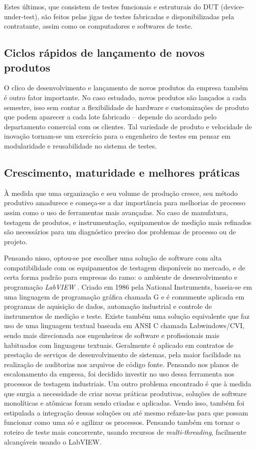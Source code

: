         Estes últimos, que consistem de testes funcionais e estruturais do DUT (device-under-test), são feitos pelas jigas de testes fabricadas e disponibilizadas pela contratante, assim como os computadores e softwares de teste.
    \subsection{Ciclos rápidos de lançamento de novos produtos}
         O clico de desenvolvimento e lançamento de novos produtos da empresa também é outro fator importante. No caso estudado, novos produtos são lançados a cada semestre, isso sem contar a flexibilidade de hardware e customizações de produto que podem aparecer a cada lote fabricado -- depende do acordado pelo departamento comercial com os clientes. Tal variedade de produto e velocidade de inovação tornam-se um exercício para o engenheiro de testes em pensar em modularidade e reusabilidade no sistema de testes.
    \subsection{Crescimento, maturidade e melhores práticas}
    
        À medida que uma organização e seu volume de produção cresce, seu método produtivo amadurece e começa-se a dar importância para melhorias de processo assim como o uso de ferramentas mais avançadas. No caso de manufatura, testagem de produtos, e instrumentação, equipamentos de medição mais refinados são necessários para um diagnóstico preciso dos problemas de processo ou de projeto.
        
        Pensando nisso, optou-se por escolher uma solução de software com alta compatibilidade com os equipamentos de testagem disponíveis no mercado, e de certa forma padrão para empresas do ramo: o ambiente de desenvolvimento e programação \textit{LabVIEW} . Criado em 1986 pela National Instruments, baseia-se em uma linguagem de programação gráfica chamada G e é comumente aplicada em programas de aquisição de dados, automação industrial e controle de instrumentos de medição e teste. Existe também uma solução equivalente que faz uso de uma linguagem textual baseada em ANSI C chamada Labwindows/CVI, sendo mais direcionada aos engenheiros de software e profissionais mais habituados com linguagens textuais. Geralmente é aplicado em contratos de prestação de serviços de desenvolvimento de sistemas, pela maior facilidade na realização de auditorias nos arquivos de código fonte. Pensando nos planos de escalonamento da empresa, foi decidido investir no uso dessa ferramenta nos processos de testagem industriais.
        Um outro problema encontrado é que à medida que surgia a necessidade de criar novas práticas produtivas, soluções de software monolíticas e atômicas foram sendo criadas e aplicadas. Vendo isso, também foi estipulada a integração dessas soluções ou até mesmo refaze-las para que possam funcionar como uma só e agilizar os processos. Pensando também em tornar o roteiro de teste mais concorrente, usando recursos de \textit{multi-threading}, facilmente alcançáveis usando o LabVIEW. 
